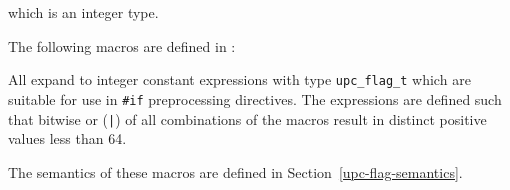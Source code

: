 which is an integer type.

\np The following macros are defined in \header:

\vspace{8pt}

All expand to integer constant expressions with type {\tt upc\_flag\_t}
which are suitable for use in {\tt \#if} preprocessing directives.
The expressions are defined such that bitwise or ({\tt |}) of all combinations 
of the macros result in distinct positive values less than 64.

\np The semantics of these macros are defined in Section~\ref{upc-flag-semantics}.


